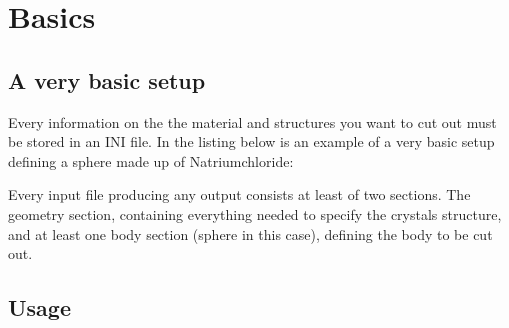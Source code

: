 \section{Basics}
\subsection{A very basic setup}

Every information on the the material and structures you want to cut out must be stored in an INI file. In the listing below is an example of a very basic setup defining a sphere made up of Natriumchloride:

Every input file producing any output consists at least of two sections. The geometry section, containing everything needed to specify the crystals structure, and at least one body section (sphere in this case), defining the body to be cut out.

\subsection{Usage}
